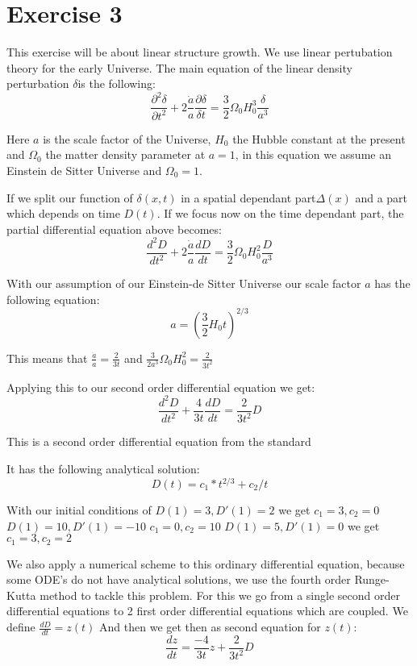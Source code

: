 \section{Exercise 3}
This exercise will be about linear structure growth. We use linear pertubation theory for the early Universe. The main equation of the linear density perturbation $\delta $is the following:
\begin{equation}
\frac{\partial^2\delta}{\partial t^2}+2\frac{\dot{a}}{a}\frac{\partial\delta}{\delta t}=\frac{3}{2}\Omega_0H_0^3\frac{\delta}{a^3}
\end{equation}

Here $a$ is the scale factor of the Universe, $H_0$ the Hubble constant at the present and $\Omega_0$ the matter density parameter at $a=1$, in this equation we assume an Einstein de Sitter Universe and $\Omega_0=1$.

If we split our function of $\delta(x,t)$ in a spatial dependant part$\Delta(x)$ and a part which depends on time $D(t)$. If we focus now on the time dependant part, the partial differential equation above becomes:
\begin{equation}
\frac{d^2 D}{dt^2}+2\frac{\dot{a}}{a}\frac{dD}{d t}=\frac{3}{2}\Omega_0H_0^2\frac{D}{a^3}
\end{equation}

With our assumption of our Einstein-de Sitter Universe our scale factor $a$ has the following equation:
\begin{equation}
a=\left(\frac{3}{2}H_0t\right)^{2/3}
\end{equation}

This means that $\frac{\dot{a}}{a}=\frac{2}{3t}$ and $\frac{3}{2a^3}\Omega_0H_0^2=\frac{2}{3t^2}$

Applying this to our second order differential equation we get:
\begin{equation}
\frac{d^2 D}{dt^2}+\frac{4}{3t}\frac{dD}{d t}=\frac{2}{3t^2} D
\end{equation}

This is a second order differential equation from the standard 

It has the following analytical solution:
\begin{equation}
D(t)=c_1*t^{2/3}+c_2/t
\end{equation}

With our initial conditions of 
$D(1)=3,D'(1)=2$ we get $c_1=3,c_2=0$
$D(1)=10,D'(1)=-10$ $c_1=0,c_2=10$
$D(1)=5,D'(1)=0$ we get $c_1=3,c_2=2$

We also apply a numerical scheme to this ordinary differential equation, because some ODE's do not have analytical solutions, we use the fourth order Runge-Kutta method to tackle this problem. For this we go from a single second order differential equations to 2 first order differential equations which are coupled. We define $\frac{dD}{dt}=z(t)$
And then we get then as second equation for $z(t)$:
\begin{equation}
\frac{dz}{dt}=\frac{-4}{3t}z+\frac{2}{3t^2}D
\end{equation}

